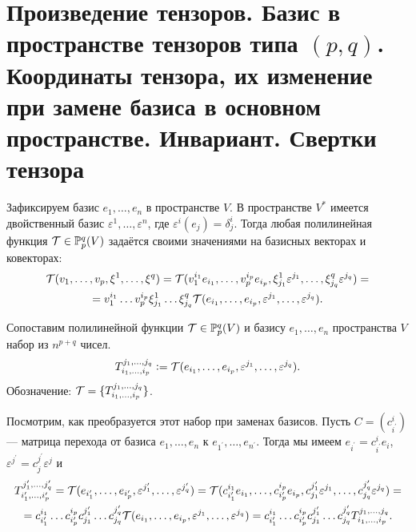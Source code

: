 \section{Произведение тензоров. Базис в пространстве тензоров типа $(p, q)$. Координаты тензора, их изменение при замене базиса в основном пространстве. Инвариант. Свертки тензора}

Зафиксируем базис $e_1, \ldots, e_n$ в пространстве $V$. В пространстве $V^\ast$ имеется двойственный базис $\varepsilon^1, \ldots, \varepsilon^n$, где $\varepsilon^i(e_j) = \delta^i_j$. Тогда любая полилинейная функция $\mathcal{T} \in \mathbb{P}_p^q(V)$ задаётся своими значениями на базисных векторах и ковекторах:
\begin{multline*}
    \mathcal{T}(v_1, \ldots, v_p, \xi^1, \ldots, \xi^q) = \mathcal{T}(v_1^{i_1}e_{i_1}, \ldots, v_p^{i_p}e_{i_p}, \xi^1_{j_1}\varepsilon^{j_1}, \ldots, \xi^q_{j_q}\varepsilon^{j_q}) =\\ = v_1^{i_1} \ldots v_p^{i_p}\xi^1_{j_1}\ldots \xi^q_{j_q}\mathcal{T}(e_{i_1}, \ldots, e_{i_p}, \varepsilon^{j_1}, \ldots, \varepsilon^{j_q}).
\end{multline*}

\begin{definition}
    Сопоставим полилинейной функции $\mathcal{T} \in \mathbb{P}_p^q(V)$ и базису $e_1, \ldots, e_n$ пространства $V$ набор из $n^{p + q}$ чисел.
    \[
        T_{i_1, \ldots, i_p}^{j_1, \ldots, j_q} \vcentcolon = \mathcal{T}(e_{i_1}, \ldots, e_{i_p}, \varepsilon^{j_1}, \ldots, \varepsilon^{j_q}).
    \]
    Обозначение: $\mathcal{T} = \{T_{i_1, \ldots, i_p}^{j_1, \ldots, j_q}\}$.
\end{definition}

Посмотрим, как преобразуется этот набор при заменах базисов. Пусть $C = (c^i_{i^\prime})$ --- матрица перехода от базиса $e_1, \ldots, e_n$ к $e_{1^\prime}, \ldots, e_{n^\prime}$. Тогда мы имеем $e_{i^\prime} = c^i_{i^\prime}e_i$, $\varepsilon^{j^\prime} = c^{j^\prime}_j\varepsilon^j$ и
\begin{multline*}
    T_{i_1^\prime, \ldots, i_p^\prime}^{j_1^\prime, \ldots, j_q^\prime} = \mathcal{T}(e_{i_1^\prime}, \ldots, e_{i_p^\prime}, \varepsilon^{j_1^\prime}, \ldots, \varepsilon^{j_q^\prime}) = \mathcal{T}(c^{i_1}_{i_1^\prime}e_{i_1}, \ldots, c^{i_p}_{i_p^\prime}e_{i_p}, c^{j_1^\prime}_{j_1}\varepsilon^{j_1}, \ldots, c^{j_q^\prime}_{j_q}\varepsilon^{j_q}) =\\ = c^{i_1}_{i_1^\prime}\ldots c^{i_p}_{i_p^\prime}c^{j_1^\prime}_{j_1}\ldots c^{j_q^\prime}_{j_q}\mathcal{T}(e_{i_1}, \ldots, e_{i_p}, \varepsilon^{j_1}, \ldots, \varepsilon^{j_q}) = c^{i_1}_{i_1^\prime}\ldots c^{i_p}_{i_p^\prime}c^{j_1^\prime}_{j_1}\ldots c^{j_q^\prime}_{j_q}T_{i_1, \ldots, i_p}^{j_1, \ldots, j_q}.
\end{multline*}

